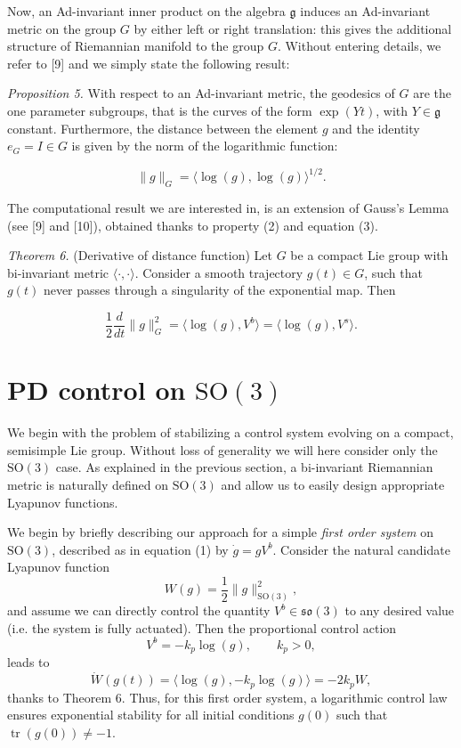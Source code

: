 \documentclass[10pt,twocolumn]{article}
\newcommand{\SO}{\mathrm{SO}}
\newcommand{\so}{\mathfrak{so}}
\newcommand{\gfrak}{\mathfrak g}
\newcommand{\tr}{\operatorname{tr}}
\newcommand{\paperhead}[2]{\par\medskip\noindent\textit{#1} #2\par}
\begin{document}
Now, an Ad-invariant inner product on the algebra $\gfrak$ induces an Ad-invariant metric on the group $G$ by either left or right translation: this gives the additional structure of Riemannian manifold to the group $G$. Without entering details, we refer to [9] and we simply state the following result:

\paperhead{Proposition 5.}{With respect to an Ad-invariant metric, the geodesics of $G$ are the one parameter subgroups, that is the curves of the form $\exp(Yt)$, with $Y\in\gfrak$ constant. Furthermore, the distance between the element $g$ and the identity $e_G=I\in G$ is given by the norm of the logarithmic function:}
\begin{equation*}
\|g\|_G=\langle\log(g),\log(g)\rangle^{1/2}.\tag{3}
\end{equation*}

The computational result we are interested in, is an extension of Gauss's Lemma (see [9] and [10]), obtained thanks to property (2) and equation (3).

\paperhead{Theorem 6.}{(Derivative of distance function) Let $G$ be a compact Lie group with bi-invariant metric $\langle\cdot,\cdot\rangle$. Consider a smooth trajectory $g(t)\in G$, such that $g(t)$ never passes through a singularity of the exponential map. Then}
\begin{equation*}
\frac12\frac{d}{dt}\|g\|_G^2=\langle\log(g),V^b\rangle=\langle\log(g),V^s\rangle.
\end{equation*}

\section{PD control on $\SO(3)$}
We begin with the problem of stabilizing a control system evolving on a compact, semisimple Lie group. Without loss of generality we will here consider only the $\SO(3)$ case. As explained in the previous section, a bi-invariant Riemannian metric is naturally defined on $\SO(3)$ and allow us to easily design appropriate Lyapunov functions.

We begin by briefly describing our approach for a simple \emph{first order system} on $\SO(3)$, described as in equation (1) by $\dot g=gV^b$. Consider the natural candidate Lyapunov function
\begin{equation*}
W(g)=\frac12\|g\|_{\SO(3)}^2,
\end{equation*}
and assume we can directly control the quantity $V^b\in\so(3)$ to any desired value (i.e. the system is fully actuated). Then the proportional control action
\begin{equation*}
V^b=-k_p\log(g),\qquad k_p>0,\tag{4}
\end{equation*}
leads to
\begin{equation*}
\dot W(g(t))=\langle\log(g),-k_p\log(g)\rangle=-2k_pW,
\end{equation*}
thanks to Theorem 6. Thus, for this first order system, a logarithmic control law ensures exponential stability for all initial conditions $g(0)$ such that $\tr(g(0))\neq-1$.
\end{document}
